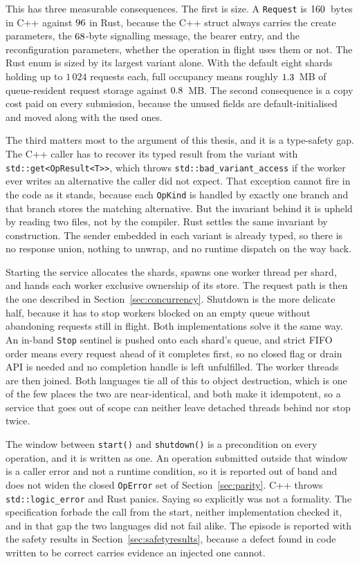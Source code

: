 \documentclass[english,oneside,a4paper,censored,csm,software-track-2020]{HYthesisML}
\begin{document}
This has three measurable consequences. The first is size. A \texttt{Request} is $160$~bytes
in C++ against $96$ in Rust, because the C++ struct always carries the create parameters, the
$68$-byte signalling message, the bearer entry, and the reconfiguration parameters, whether
the operation in flight uses them or not. The Rust enum is sized by its largest variant
alone. With the default eight shards holding up to $1\,024$ requests each, full occupancy means roughly $1.3$~MB of
queue-resident request storage against $0.8$~MB. The second consequence is a copy cost
paid on every submission, because the unused fields are default-initialised and moved along with
the used ones.

The third matters most to the argument of this thesis, and it is a type-safety
gap. The C++ caller has to recover its typed result from the variant with
\texttt{std::get<OpResult<T>>}, which throws \texttt{std::bad\_variant\_access} if the worker
ever writes an alternative the caller did not expect. That exception cannot fire in the
code as it stands, because each \texttt{OpKind} is handled by exactly one branch and that branch
stores the matching alternative. But the invariant behind it is upheld by reading two
files, not by the compiler. Rust settles the same invariant by construction. The sender embedded
in each variant is already typed, so there is no response union, nothing to unwrap, and no
runtime dispatch on the way back.

Starting the service allocates the shards, spawns one worker thread per shard, and hands each
worker exclusive ownership of its store. The request path is then the one described in
Section~\ref{sec:concurrency}. Shutdown is the more delicate half, because it has to stop
workers blocked on an empty queue without abandoning requests still in flight. Both
implementations solve it the same way. An in-band \texttt{Stop} sentinel is pushed onto each
shard's queue, and strict FIFO order means every request ahead of it completes first, so no
closed flag or drain API is needed and no completion handle is left unfulfilled. The worker
threads are then joined. Both languages tie all of this to object destruction, which is one of
the few places the two are near-identical, and both make it idempotent, so a service that goes
out of scope can neither leave detached threads behind nor stop twice.

The window between \texttt{start()} and \texttt{shutdown()} is a precondition on every
operation, and it is written as one. An operation submitted outside that window is a caller
error and not a runtime condition, so it is reported out of band and does not widen the closed
\texttt{OpError} set of Section~\ref{sec:parity}. C++ throws \texttt{std::logic\_error} and Rust
panics. Saying so explicitly was not a formality. The specification forbade the call from the
start, neither implementation checked it, and in that gap the two languages did not fail alike.
The episode is reported with the safety results in Section~\ref{sec:safetyresults}, because a
defect found in code written to be correct carries evidence an injected one cannot.
\end{document}
